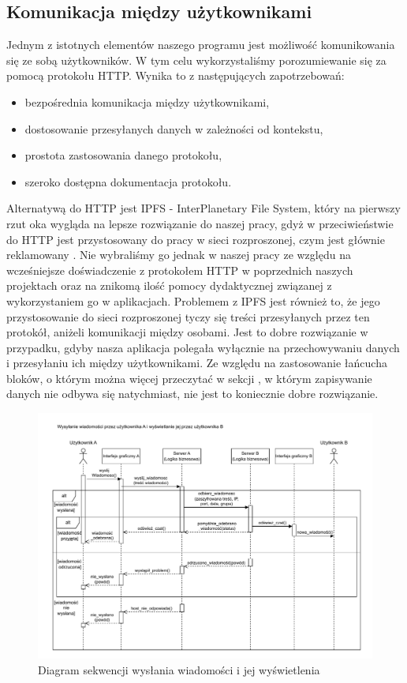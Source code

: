 \subsection{Komunikacja między użytkownikami}
\label{sec:Komunikacja}
Jednym z istotnych elementów naszego programu jest możliwość komunikowania się ze sobą użytkowników. W tym celu wykorzystaliśmy porozumiewanie się za pomocą protokołu HTTP. Wynika to z następujących zapotrzebowań:
\begin{itemize}
    \item bezpośrednia komunikacja między użytkownikami,
    \item dostosowanie przesyłanych danych w zależności od kontekstu,
    \item prostota zastosowania danego protokołu,
    \item szeroko dostępna dokumentacja protokołu.
\end{itemize}
Alternatywą do HTTP jest IPFS - InterPlanetary File System, który na pierwszy rzut oka wygląda na  lepsze rozwiązanie do naszej pracy, gdyż w przeciwieństwie do HTTP jest przystosowany do pracy w sieci rozproszonej, czym jest głównie reklamowany \cite{IPFS}. Nie wybraliśmy go jednak w naszej pracy ze względu na wcześniejsze doświadczenie z protokołem HTTP w poprzednich naszych projektach oraz na znikomą ilość pomocy dydaktycznej związanej z wykorzystaniem go w aplikacjach. Problemem z IPFS jest również to, że jego przystosowanie do sieci rozproszonej tyczy się treści przesyłanych przez ten protokół, aniżeli komunikacji między osobami. Jest to dobre rozwiązanie w przypadku, gdyby nasza aplikacja polegała wyłącznie na przechowywaniu danych i przesyłaniu ich między użytkownikami. Ze względu na zastosowanie łańcucha bloków, o którym można więcej przeczytać w sekcji , w którym zapisywanie danych nie odbywa się natychmiast, nie jest to koniecznie dobre rozwiązanie.
\clearpage
\begin{figure}[!ht]
    \centering
		\includegraphics[width=1\linewidth]{Images/wysylanie_wiadomosci.pdf}
	\caption{Diagram sekwencji wysłania wiadomości i jej wyświetlenia}
	\label{fig:wysylanieWiadomosci}
\end{figure}

